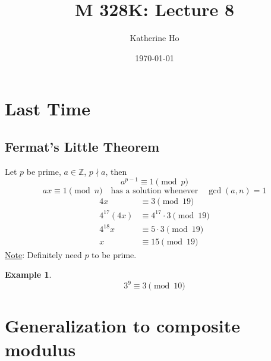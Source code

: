 \documentclass[letterpaper]{article}
\title{M 328K: Lecture 8}
\author{Katherine Ho}
\date\today
\newcommand{\ZZ}{\mathbb{Z}}
\newtheorem{example}{Example}[subsection]
\begin{document}
\maketitle

\section{Last Time}
    \subsection{Fermat's Little Theorem}
        Let $p$ be prime, $a\in\ZZ$, $p\nmid a$, then 
        \[ a^{p-1}\equiv 1\pmod{p} \]
        \[ ax\equiv 1\pmod{n} \quad\text{has a solution whenever}\quad \gcd(a,n)=1 \]
        \begin{align*}
            4x &\equiv 3\pmod{19} \\
            4^{17}(4x) &\equiv 4^{17}\cdot 3\pmod{19} \\
            4^{18}x &\equiv 5\cdot 3\pmod{19} \\
            x &\equiv 15\pmod{19}
        \end{align*}
        \underline{Note}: Definitely need $p$ to be prime.
    \begin{example}
        \[ 3^9\equiv 3\pmod{10} \]
    \end{example}

\section{Generalization to composite modulus}
\end{document}
